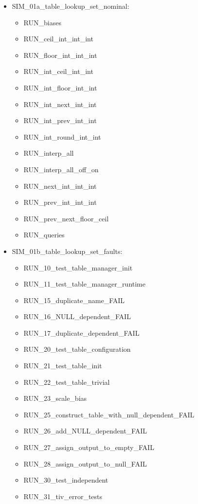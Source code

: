 \documentclass[11pt,fleqn]{report}
\begin{document}
\begin{itemize}
  \item SIM\_01a\_table\_lookup\_set\_nominal:
  \begin{itemize}
    \item RUN\_biases
    \item RUN\_ceil\_int\_int\_int
    \item RUN\_floor\_int\_int\_int
    \item RUN\_int\_ceil\_int\_int
    \item RUN\_int\_floor\_int\_int
    \item RUN\_int\_next\_int\_int
    \item RUN\_int\_prev\_int\_int
    \item RUN\_int\_round\_int\_int
    \item RUN\_interp\_all
    \item RUN\_interp\_all\_off\_on
    \item RUN\_next\_int\_int\_int
    \item RUN\_prev\_int\_int\_int
    \item RUN\_prev\_next\_floor\_ceil
    \item RUN\_queries
  \end{itemize}

  \item SIM\_01b\_table\_lookup\_set\_faults:
  \begin{itemize}
    \item RUN\_10\_test\_table\_manager\_init
    \item RUN\_11\_test\_table\_manager\_runtime
    \item RUN\_15\_duplicate\_name\_FAIL
    \item RUN\_16\_NULL\_dependent\_FAIL
    \item RUN\_17\_duplicate\_dependent\_FAIL
    \item RUN\_20\_test\_table\_configuration
    \item RUN\_21\_test\_table\_init
    \item RUN\_22\_test\_table\_trivial
    \item RUN\_23\_scale\_bias
    \item RUN\_25\_construct\_table\_with\_null\_dependent\_FAIL
    \item RUN\_26\_add\_NULL\_dependent\_FAIL
    \item RUN\_27\_assign\_output\_to\_empty\_FAIL
    \item RUN\_28\_assign\_output\_to\_null\_FAIL
    \item RUN\_30\_test\_independent
    \item RUN\_31\_tiv\_error\_tests
  \end{itemize}


\end{itemize}
\end{document}
